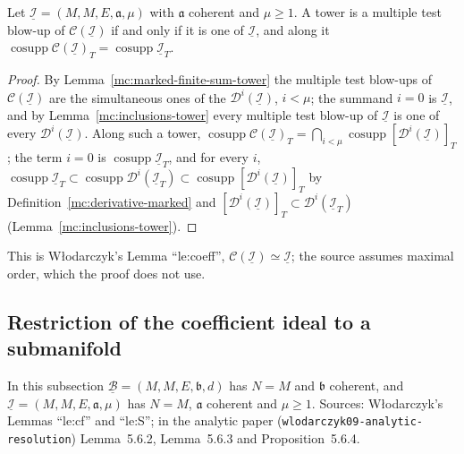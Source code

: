 \begin{lemma}
\label{mc:coefficient-equivalent}
\leanok
Let \(\underline{\mathcal I}=(M,M,E,\mathfrak a,\mu)\) with \(\mathfrak a\) coherent and \(\mu\ge1\). A tower is a multiple test blow-up of
\(\mathcal C(\underline{\mathcal I})\) if and only if it is one of \(\underline{\mathcal I}\), and along it
\(\operatorname{cosupp}\mathcal C(\underline{\mathcal I})_T=\operatorname{cosupp}\underline{\mathcal I}_T\).
\end{lemma}
\begin{proof}
\leanok
By Lemma~\ref{mc:marked-finite-sum-tower} the multiple test blow-ups of \(\mathcal C(\underline{\mathcal I})\) are the simultaneous ones of the
\(\mathcal D^i(\underline{\mathcal I})\), \(i<\mu\); the summand \(i=0\) is \(\underline{\mathcal I}\), and by Lemma~\ref{mc:inclusions-tower} every multiple test blow-up
of \(\underline{\mathcal I}\) is one of every \(\mathcal D^i(\underline{\mathcal I})\). Along such a tower,
\(\operatorname{cosupp}\mathcal C(\underline{\mathcal I})_T=\bigcap_{i<\mu}\operatorname{cosupp}[\mathcal D^i(\underline{\mathcal I})]_T\); the term \(i=0\) is
\(\operatorname{cosupp}\underline{\mathcal I}_T\), and for every \(i\), \(\operatorname{cosupp}\underline{\mathcal I}_T\subset\operatorname{cosupp}\mathcal D^i(\underline{\mathcal I}_T)\subset
\operatorname{cosupp}[\mathcal D^i(\underline{\mathcal I})]_T\) by Definition~\ref{mc:derivative-marked} and \([\mathcal D^i(\underline{\mathcal I})]_T\subset\mathcal D^i(\underline{\mathcal I}_T)\)
(Lemma~\ref{mc:inclusions-tower}).
\end{proof}
This is Włodarczyk's Lemma ``le:coeff'', \(\mathcal C(\underline{\mathcal I})\simeq\underline{\mathcal I}\); the source assumes maximal order, which the proof does not use.

\subsection{Restriction of the coefficient ideal to a submanifold}

In this subsection \(\underline{\mathcal B}=(M,M,E,\mathfrak b,d)\) has \(N=M\) and \(\mathfrak b\) coherent, and \(\underline{\mathcal I}=(M,M,E,\mathfrak a,\mu)\) has
\(N=M\), \(\mathfrak a\) coherent and \(\mu\ge1\). Sources: Włodarczyk's Lemmas ``le:cf'' and ``le:S''; in the analytic paper
(\texttt{wlodarczyk09-analytic-resolution}) Lemma~5.6.2, Lemma~5.6.3 and Proposition~5.6.4.

